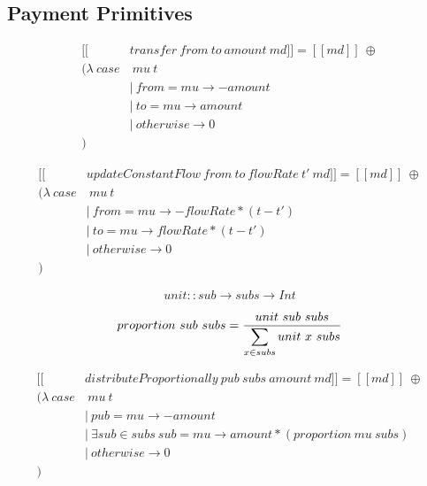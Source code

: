 \subsection{Payment Primitives}

\begin{equation}\label{sem_transfer}
    \begin{split}
        [\![&transfer\ from\ to\ amount\ md]\!] = [\![md]\!]\ \oplus \\
        (\lambda\ case&\ mu\ t \\
        &|\ from = mu \rightarrow -amount \\
        &|\ to   = mu \rightarrow amount \\
        &|\ otherwise \rightarrow 0 \\
        )
    \end{split}
\end{equation}

\begin{equation}\label{sem_updateConstantFlow}
    \begin{split}
        [\![&updateConstantFlow\ from\ to\ flowRate\ t'\ md]\!] = [\![md]\!]\ \oplus \\
        (\lambda\ case&\ mu\ t \\
        &|\ from = mu \rightarrow -flowRate * (t - t') \\
        &|\ to   = mu \rightarrow flowRate  * (t - t') \\
        &|\ otherwise \rightarrow 0 \\
        )
    \end{split}
\end{equation}

\begin{equation}
    unit :: sub \rightarrow subs \rightarrow Int
\end{equation}

\begin{equation}
    proportion\ sub\ subs = {{ unit\ sub\ subs } \over { \displaystyle \sum_{x \in subs} unit\ x\ subs }}
\end{equation}

\begin{equation}\label{sem_distributeProportionally}
    \begin{split}
        [\![&distributeProportionally\ pub\ subs\ amount\ md]\!] = [\![md]\!]\ \oplus \\
        (\lambda\ case&\ mu\ t \\
        &|\ pub = mu \rightarrow -amount \\
        &|\ \exists sub \in subs\ { sub = mu } \rightarrow amount * (proportion\ mu\ subs) \\
        &|\ otherwise \rightarrow 0 \\
        )
    \end{split}
\end{equation}


